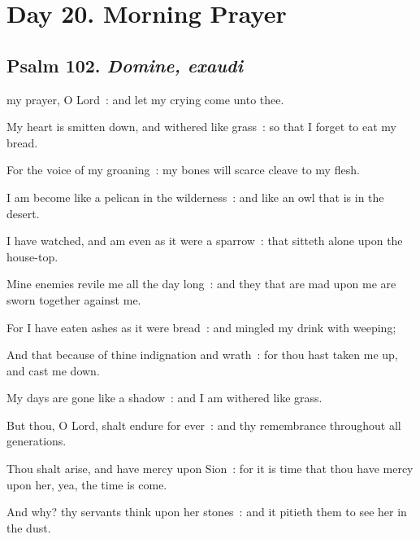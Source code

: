 \section*{Day 20. Morning Prayer}

\subsection{Psalm 102. \textit{Domine, exaudi}}


 my prayer, O Lord~: and let my crying come unto thee.\par
{}
My heart is smitten down, and withered like grass~: so that I forget to eat my bread.\par
{}For the voice of my groaning~: my bones will scarce cleave to my flesh.\par
{}I am become like a pelican in the wilderness~: and like an owl that is in the desert.\par
{}I have watched, and am even as it were a sparrow~: that sitteth alone upon the house-top.\par
{}Mine enemies revile me all the day long~: and they that are mad upon me are sworn together against me.\par
{}For I have eaten ashes as it were bread~: and mingled my drink with weeping;\par
{}And that because of thine indignation and wrath~: for thou hast taken me up, and cast me down.\par
{}My days are gone like a shadow~: and I am withered like grass.\par
{}But thou, O Lord, shalt endure for ever~: and thy remembrance throughout all generations.\par
{}Thou shalt arise, and have mercy upon Sion~: for it is time that thou have mercy upon her, yea, the time is come.\par
{}And why? thy servants think upon her stones~: and it pitieth them to see her in the dust.\par

